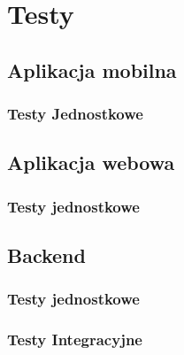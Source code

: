 \chapter{Testy}

\section{Aplikacja mobilna}
\subsection{Testy Jednostkowe}

\section{Aplikacja webowa}
\subsection{Testy jednostkowe}

\section{Backend}
\subsection{Testy jednostkowe}

\subsection{Testy Integracyjne}